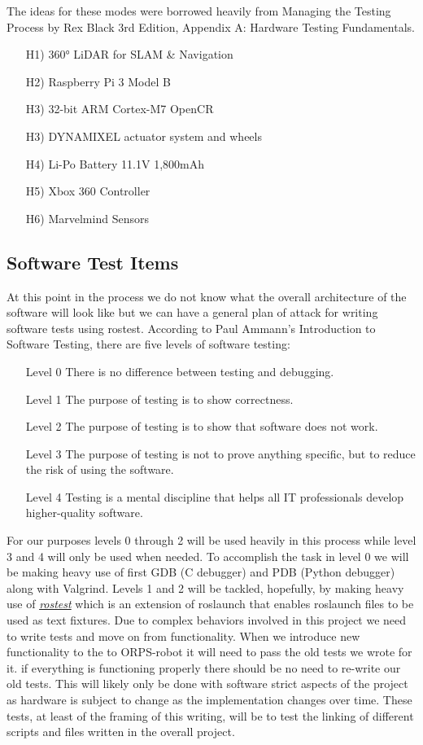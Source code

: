\documentclass[english,12pt]{article}
\begin{document}
The ideas for these modes were borrowed heavily from Managing the Testing Process by Rex Black 3rd Edition, 
Appendix A: Hardware Testing Fundamentals. 
\begin{itemize}
\item[H1)] \ang{360} LiDAR for SLAM \& Navigation
\item[H2)] Raspberry Pi 3 Model B
\item[H3)] 32-bit ARM Cortex-M7 OpenCR
\item[H3)] DYNAMIXEL actuator system and wheels
\item[H4)] Li-Po Battery 11.1V 1,800mAh 
\item[H5)] Xbox 360 Controller 
\item[H6)] Marvelmind Sensors
\end{itemize}
\subsection{Software Test Items}
At this point in the process we do not know what the overall architecture of the software will 
look like but we can have a general plan of attack for writing software tests using rostest. According 
to Paul Ammann's Introduction to Software Testing, there are five levels of software testing: \\
\begin{itemize}
    \item[Level 0] There is no difference between testing and debugging.
    \item[Level 1] The purpose of testing is to show correctness.
    \item[Level 2] The purpose of testing is to show that software does not work.
    \item[Level 3] The purpose of testing is not to prove anything specific, 
    but to reduce the risk of using the software.
    \item[Level 4] Testing is a mental discipline that helps all IT professionals 
    develop higher-quality software.
\end{itemize}
For our purposes levels 0 through 2 will be used heavily in this process while level 3 and 4 will 
only be used when needed. To accomplish the task in level 0 we will be making heavy use of first 
GDB (C debugger) and PDB (Python debugger) along with Valgrind. Levels 1 and 2 will be tackled, 
hopefully, by making heavy use of \href{http://wiki.ros.org/rostest}{\textit{rostest}} which is an 
extension of roslaunch that enables roslaunch files to be used as text fixtures. Due to complex 
behaviors involved in this project we need to write tests and move on from functionality. When we 
introduce new functionality to the to ORPS-robot it will need to pass the old tests we wrote for it. 
if everything is functioning properly there should be no need to re-write our old tests. This will 
likely only be done with software strict aspects of the project as hardware is subject to change as 
the implementation changes over time. These tests, at least of the framing of this writing, will be 
to test the linking of different scripts and files written in the overall project. 
\end{document}
